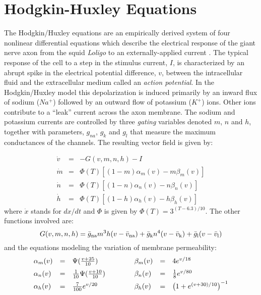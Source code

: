\section{Hodgkin-Huxley Equations}

\noindent The Hodgkin/Huxley equations are an empirically derived system of four
nonlinear differential equations which describe the electrical response of  the giant nerve
axon from the squid {\em Loligo} to an externally-applied current \cite{hh1}.  The typical 
response of the cell to a step in the stimulus current, $I$, is characterized by
an abrupt spike in the electrical potential 
difference, $v$, between the intracellular fluid and the extracellular medium called an
{\em action potential}.   In the Hodgkin/Huxley model this depolarization is induced primarily by an inward flux of sodium ($Na^+$) followed by
an outward flow of potassium ($K^+$) ions. Other ions contribute to
a ``leak'' current across the
axon membrane. The sodium and potassium currents are controlled 
by three {\em gating} variables denoted
$m$, $n$ and $h$, together with parameters, 
$g_{na}$, $g_k$ and $g_l$ that measure the maximum conductances of
the channels.  The resulting vector field is given by:

\begin{equation}
\label{hheq1}
\begin{array}{lcl}
\dot v &=&-G(v,m,n,h) - I\\
\dot m &=&\Phi (T) \left[(1-m)  \alpha _m(v) - m \beta _m(v)\right]\\
\dot n &=&\Phi (T) \left[(1-n)  \alpha _n(v) - n \beta _n(v)\right]\\
\dot h &=&\Phi (T) \left[(1-h)  \alpha _h(v) - h \beta _h(v)\right]
\end{array}
\end{equation}
where $\dot x$ stands for $dx/dt$ and $\Phi$ is given by
$\Phi (T)=3^{(T-6.3) / 10}$. The other functions involved are:
$$G(v,m,n,h)=\bar{g}_{\rm na} m^3h(v-\bar{v}_{\rm na}) + \bar{g}_{\rm k}
n^4(v-\bar{v}_{\rm k}) + \bar{g}_{\rm l}(v-\bar{v}_{\rm l})
$$
and the equations modeling the variation of membrane permeability:
$$\begin{array}{lclclcl}
\alpha _m (v)&=&\Psi ({{v+25} \over 10})
 & \rule{.2in}{0in} 
&\beta _m (v)&=&4 e^{v /18}
\\
\alpha _n (v)&=&\mbox{$\frac{1}{10}\Psi ({{v +10}\over 10})$ \rule{0in}{.2in} }
 & \rule{.2in}{0in} 
&\beta _n (v)&=&\mbox{$\frac{1}{8} e^{v/{80}}$}
\\
\alpha _h (v)&=&\mbox{$\frac{7}{100}e^{v / 20}$ \rule{0in}{0.2in} }
 & \rule{.2in}{0in} 
&\beta _h (v)&=&\left( 1+e^{(v+30)/ 10}\right)^{-1}
\end{array}$$

